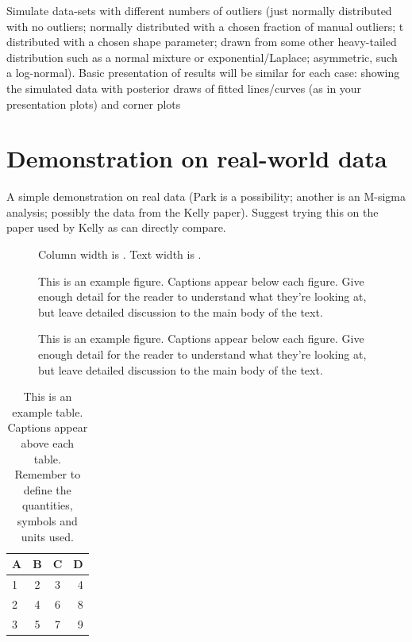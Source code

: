 \documentclass[fleqn,usenatbib]{mnras}
\begin{document}
Simulate data-sets with different numbers of outliers (just normally distributed
with no outliers; normally distributed with a chosen fraction of manual
outliers; t distributed with a chosen shape parameter; drawn from some other
heavy-tailed distribution such as a normal mixture or exponential/Laplace;
asymmetric, such a log-normal).  Basic presentation of results will be similar
for each case: showing the simulated data with posterior draws of fitted
lines/curves (as in your presentation plots) and corner plots

\section{Demonstration on real-world data}
\label{sec:real-world}

A simple demonstration on real data (Park is a possibility; another is an
M-sigma analysis; possibly the data from the Kelly paper).  Suggest trying this
on the paper used by Kelly as can directly compare.

\begin{figure}
    Column width is \the\columnwidth.
    Text width is \the\textwidth.
    \caption{This is an example figure. Captions appear below each figure.
	Give enough detail for the reader to understand what they're looking at,
	but leave detailed discussion to the main body of the text.}
    \label{fig:example_figure}
\end{figure}

\begin{figure}
    \the\textwidth
    \caption{This is an example figure. Captions appear below each figure.
	Give enough detail for the reader to understand what they're looking at,
	but leave detailed discussion to the main body of the text.}
    \label{fig:example_widefigure}
\end{figure}

\begin{table}
	\centering
	\caption{This is an example table. Captions appear above each table.
	Remember to define the quantities, symbols and units used.}
	\label{tab:example_table}
	\begin{tabular}{lccr} %
		\hline
		A & B & C & D\\
		\hline
		1 & 2 & 3 & 4\\
		2 & 4 & 6 & 8\\
		3 & 5 & 7 & 9\\
		\hline
	\end{tabular}
\end{table}
\end{document}
